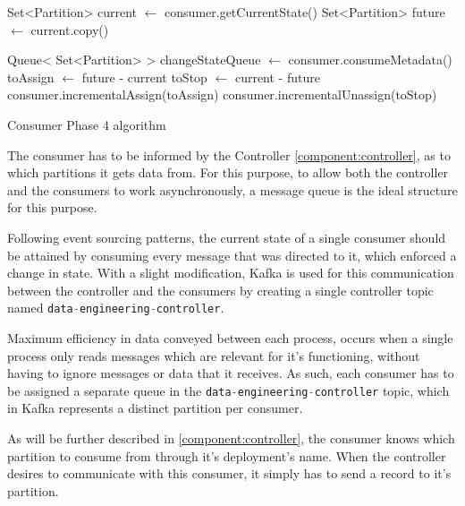 \IncMargin{1em} \begin{algorithm}[h]
     
    \Output{} \BlankLine

Set<Partition> current $\gets$ consumer.getCurrentState()\; Set<Partition>
    future $\gets$ current.copy()\;

Queue< Set<Partition> > changeStateQueue $\gets$ consumer.consumeMetadata()\;
     toAssign
    $\gets$ future - current\; \label{algo:phase_4_toAssign} toStop $\gets$
    current - future\; consumer.incrementalAssign(toAssign)\;
    consumer.incrementalUnassign(toStop)\;
    \label{algo:phase_4_incremental_assign}

\caption{Consumer Phase 4 algorithm} \label{algo:phase_4}
\end{algorithm}\DecMargin{1em}

The consumer has to be informed by the Controller \ref{component:controller}, as
to which partitions it gets data from. For this purpose, to allow both the
controller and the consumers to work asynchronously, a message queue is the
ideal structure for this purpose.

Following event sourcing patterns, the current state of a single consumer should
be attained by consuming every message that was directed to it, which enforced a
change in state. With a slight modification, Kafka is used for this
communication between the controller and the consumers by creating a single
controller topic named \lstinline[language=Python]{data-engineering-controller}.

Maximum efficiency in data conveyed between each process, occurs when a single
process only reads messages which are relevant for it's functioning, without
having to ignore messages or data that it receives. As such, each consumer has
to be assigned a separate queue in the
\lstinline[language=Python]{data-engineering-controller} topic, which in Kafka
represents a distinct partition per consumer.

As will be further described in \ref{component:controller}, the consumer knows
which partition to consume from through it's deployment's name. When the
controller desires to communicate with this consumer, it simply has to send a
record to it's partition. 

